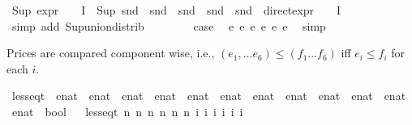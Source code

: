 \begin{isabellebody}
\ {\isacartoucheopen}Sup\ {\isacharparenleft}{\kern0pt}{\isacharparenleft}{\kern0pt}expr{\isacharunderscore}{\kern0pt}{}\ {\isasymcirc}\ {\isasymPhi}{\isacharparenright}{\kern0pt}\ {\isacharbackquote}{\kern0pt}\ I{\isacharparenright}{\kern0pt}\ {\isacharequal}{\kern0pt}\ Sup\ {\isacharparenleft}{\kern0pt}{\isacharparenleft}{\kern0pt}snd\ {\isasymcirc}\ snd\ {\isasymcirc}\ snd\ {\isasymcirc}\ snd\ {\isasymcirc}\ snd\ {\isasymcirc}\ direct{\isacharunderscore}{\kern0pt}expr\ {\isasymcirc}\ {\isasymPhi}{\isacharparenright}{\kern0pt}\ {\isacharbackquote}{\kern0pt}\ I{\isacharparenright}{\kern0pt}{\isacartoucheclose}\isanewline
\ \ \ \ \ \ \isamarkupfalse%
\ {\isacharparenleft}{\kern0pt}simp\ add{\isacharcolon}{\kern0pt}\ Sup{\isacharunderscore}{\kern0pt}union{\isacharunderscore}{\kern0pt}distrib{\isacharparenright}{\kern0pt}\isanewline
\ \ \isamarkupfalse%
\isanewline
\isanewline
\ \ \isamarkupfalse%
\ \isamarkupfalse%
\ {\isacharquery}{\kern0pt}case\ \isamarkupfalse%
\ e{}\ e{}\ e{}\ e{}\ e{}\ e{}\ \isamarkupfalse%
\ simp\isanewline
{}\isamarkupfalse%
%
\endisatagproof
{\isafoldproof}%
%
\isadelimproof
%
\endisadelimproof
%
\begin{isamarkuptext}%
Prices are compared component wise, i.e., $(e_1, \ldots e_6) \leq (f_1 \ldots f_6)$ iff $e_i \leq f_i$ for each $i$.%
\end{isamarkuptext}\isamarkuptrue%
\isamarkupfalse%
\ less{\isacharunderscore}{\kern0pt}eq{\isacharunderscore}{\kern0pt}t\ {\isacharcolon}{\kern0pt}{\isacharcolon}{\kern0pt}\ {\isachardoublequoteopen}{\isacharparenleft}{\kern0pt}enat\ {\isasymtimes}\ enat\ {\isasymtimes}\ enat\ {\isasymtimes}\ enat\ {\isasymtimes}\ enat\ {\isasymtimes}\ enat{\isacharparenright}{\kern0pt}\ {\isasymRightarrow}\ {\isacharparenleft}{\kern0pt}enat\ {\isasymtimes}\ enat\ {\isasymtimes}\ enat\ {\isasymtimes}\ enat\ {\isasymtimes}\ enat\ {\isasymtimes}\ enat{\isacharparenright}{\kern0pt}\ {\isasymRightarrow}\ bool{\isachardoublequoteclose}\isanewline
\ \ \isanewline
{\isachardoublequoteopen}less{\isacharunderscore}{\kern0pt}eq{\isacharunderscore}{\kern0pt}t\ {\isacharparenleft}{\kern0pt}n{}{\isacharcomma}{\kern0pt}\ n{}{\isacharcomma}{\kern0pt}\ n{}{\isacharcomma}{\kern0pt}\ n{}{\isacharcomma}{\kern0pt}\ n{}{\isacharcomma}{\kern0pt}\ n{}{\isacharparenright}{\kern0pt}\ {\isacharparenleft}{\kern0pt}i{}{\isacharcomma}{\kern0pt}\ i{}{\isacharcomma}{\kern0pt}\ i{}{\isacharcomma}{\kern0pt}\ i{}{\isacharcomma}{\kern0pt}\ i{}{\isacharcomma}{\kern0pt}\ i{}{\isacharparenright}{\kern0pt}\ {\isacharequal}{\kern0pt}\isanewline

\end{isabellebody}
